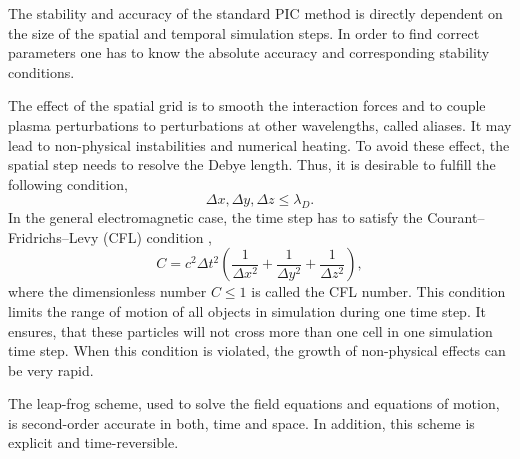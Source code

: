 The stability and accuracy of the standard PIC method is directly dependent on the size of the spatial and temporal simulation steps. In order to find correct parameters one has to know the absolute accuracy and corresponding stability conditions.

The effect of the spatial grid is to smooth the interaction forces and to couple plasma perturbations to perturbations at other wavelengths, called aliases. It may lead to non-physical instabilities and numerical heating. To avoid these effect, the spatial step needs to resolve the Debye length. Thus, it is desirable to fulfill the following condition,
\begin{equation}
\Delta x, \Delta y, \Delta z \leq \lambda_{D}.
\end{equation}
In the general electromagnetic case, the time step has to satisfy the Courant--Fridrichs--Levy (CFL) condition \cite{jaroszynsky},
\begin{equation}
\label{3.1.4.1}
C = c^{2} \Delta t^{2} \left(\frac{1}{\Delta x^{2}} + \frac{1}{\Delta y^{2}} + \frac{1}{\Delta z^{2}}\right),
\end{equation}
where the dimensionless number $ C \leq 1 $ is called the CFL number. This condition limits the range of motion of all objects in simulation during one time step. It ensures, that these particles will not cross more than one cell in one simulation time step. When this condition is violated, the growth of non-physical effects can be very rapid. 

The leap-frog scheme, used to solve the field equations and equations of motion, is second-order accurate in both, time and space. In addition, this scheme is explicit and time-reversible.